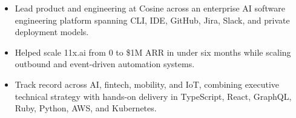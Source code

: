 

\vspace{\acvSectionContentTopSkip}
\begin{justify}
\begin{itemize}[leftmargin=2ex, nosep, noitemsep]
  \item {Lead product and engineering at Cosine across an enterprise AI software engineering platform spanning CLI, IDE, GitHub, Jira, Slack, and private deployment models.}
  \item {Helped scale 11x.ai from 0 to \$1M ARR in under six months while scaling outbound and event-driven automation systems.}
  \item {Track record across AI, fintech, mobility, and IoT, combining executive technical strategy with hands-on delivery in TypeScript, React, GraphQL, Ruby, Python, AWS, and Kubernetes.}
\end{itemize}
\end{justify}
\vspace{1.0mm}
